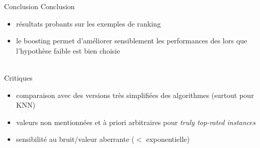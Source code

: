 \documentclass{beamer}
\begin{document}
\begin{frame}{Conclusion}
    Conclusion
    \begin{itemize}
        \item résultats probants sur les exemples de ranking
        \item le boosting permet d'améliorer sensiblement les performances
              des lors que l'hypothèse faible est bien choisie
    \end{itemize}
    ~\\
    Critiques
    \begin{itemize}
        \item comparaison avec des versions très simplifiées des algorithmes
              (surtout pour KNN)
        \item valeurs non mentionnées et à priori arbitraires pour \emph{truly
              top-rated instances}
        \item sensibilité au bruit/valeur aberrante ($<$ exponentielle)
    \end{itemize}
\end{frame}
\end{document}
